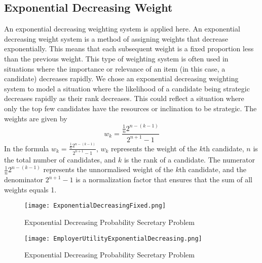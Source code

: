 \documentclass{article}
\begin{document}
\subsection{Exponential Decreasing Weight}

An exponential decreasing weighting system is applied here. An exponential decreasing weight system is a method of assigning weights that decrease exponentially. This means that each subsequent weight is a fixed proportion less than the previous weight. This type of weighting system is often used in situations where the importance or relevance of an item (in this case, a candidate) decreases rapidly. We chose an exponential decreasing weighting system to model a situation where the likelihood of a candidate being strategic decreases rapidly as their rank decreases. This could reflect a situation where only the top few candidates have the resources or inclination to be strategic. The weights are given by 
$$ w_k = \frac{\frac{1}{n}2^{n-(k-1)}}{2^{n+1}-1} $$
In the formula $w_k = \frac{\frac{1}{n}2^{n-(k-1)}}{2^{n+1}-1}$, $w_k$ represents the weight of the $k$th candidate, $n$ is the total number of candidates, and $k$ is the rank of a candidate. The numerator $\frac{1}{n}2^{n-(k-1)}$ represents the unnormalised weight of the $k$th candidate, and the denominator $2^{n+1}-1$ is a normalization factor that ensures that the sum of all weights equals 1.


\begin{table}[H]
\centering
\begin{minipage}{0.5\textwidth}
\small
\begin{figure}[H]
\centering
\centering
\texttt{[image: ExponentialDecreasingFixed.png]}
\caption{Exponential Decreasing Probability Secretary Problem}
\label{fig:exponential_decreasing}
\end{figure}
\end{minipage}\hfill
\centering
\begin{minipage}{0.5\textwidth}
\small
\begin{figure}[H]
\centering
\centering
\texttt{[image: EmployerUtilityExponentialDecreasing.png]}
\caption{Exponential Decreasing Probability Secretary Problem}
\label{fig:exponential_decreasing_employer_utility}
\end{figure}
\end{minipage}\hfill
\end{table}
\end{document}
